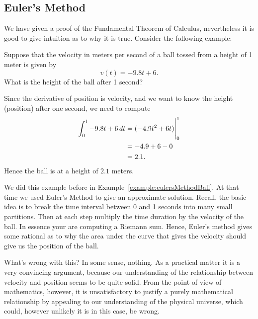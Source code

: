 \subsection*{Euler's Method}

We have given a proof of the Fundamental Theorem of Calculus,
nevertheless it is good to give intuition as to why it is
true. Consider the following example:

\begin{example}
Suppose that the velocity in meters per second of a ball tossed from a
height of 1 meter is given by
\[
v(t) = -9.8t + 6.
\]
What is the height of the ball after 1 second?
\end{example}

\begin{solution}
Since the derivative of position is velocity, and we want to know the
height (position) after one second, we need to compute
\begin{align*}
\int_0^1 -9.8t + 6 \, d t &= (-4.9t^2 + 6t)\Bigg|_0^1\\
&= -4.9 + 6 - 0\\
&= 2.1.
\end{align*}
Hence the ball is at a height of $2.1$ meters. 
\end{solution}

We did this example before in
Example~\ref{example:eulersMethodBall}. At that time we used Euler's
Method to give an approximate solution. Recall, the basic idea is to
break the time interval between 0 and 1 seconds into many small
partitions. Then at each step multiply the time duration by the
velocity of the ball. In essence your are computing a Riemann
sum. Hence, Euler's method gives some rational as to why the area
under the curve that gives the velocity should give us the position of
the ball.

What's wrong with this? In some sense, nothing. As a practical matter
it is a very convincing argument, because our understanding of the
relationship between velocity and position seems to be quite
solid. From the point of view of mathematics, however, it is
unsatisfactory to justify a purely mathematical relationship by
appealing to our understanding of the physical universe, which could,
however unlikely it is in this case, be wrong.














